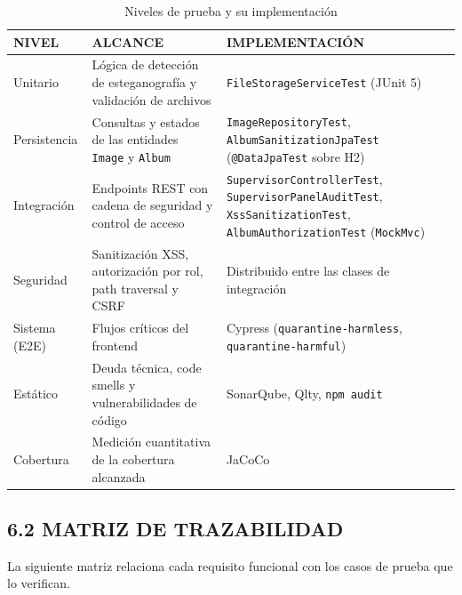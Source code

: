\begin{table}[H]
\centering
\caption{Niveles de prueba y su implementación}
\label{tab:niveles}
\begin{tabular}{|p{3.2cm}|p{5.3cm}|p{5.3cm}|}
\hline
\textbf{NIVEL} & \textbf{ALCANCE} & \textbf{IMPLEMENTACIÓN} \\
\hline
Unitario & Lógica de detección de esteganografía y validación de archivos & \texttt{FileStorageServiceTest} (JUnit 5) \\
\hline
Persistencia & Consultas y estados de las entidades \texttt{Image} y \texttt{Album} & \texttt{ImageRepositoryTest}, \texttt{AlbumSanitizationJpaTest} (\texttt{@DataJpaTest} sobre H2) \\
\hline
Integración & Endpoints REST con cadena de seguridad y control de acceso & \texttt{SupervisorControllerTest}, \texttt{SupervisorPanelAuditTest}, \texttt{XssSanitizationTest}, \texttt{AlbumAuthorizationTest} (\texttt{MockMvc}) \\
\hline
Seguridad & Sanitización XSS, autorización por rol, path traversal y CSRF & Distribuido entre las clases de integración \\
\hline
Sistema (E2E) & Flujos críticos del frontend & Cypress (\texttt{quarantine-harmless}, \texttt{quarantine-harmful}) \\
\hline
Estático & Deuda técnica, code smells y vulnerabilidades de código & SonarQube, Qlty, \texttt{npm audit} \\
\hline
Cobertura & Medición cuantitativa de la cobertura alcanzada & JaCoCo \\
\hline
\end{tabular}
\end{table}

\subsection{6.2 MATRIZ DE TRAZABILIDAD}

La siguiente matriz relaciona cada requisito funcional con los casos de prueba que lo verifican.

